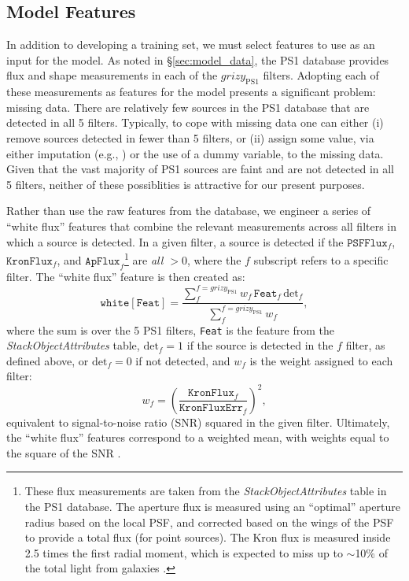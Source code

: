 \documentclass[twocolumn, dvipdfmx]{aastex62}
\begin{document}
\begin{CJK*}{UTF8}{gbsn}
\section{Model Features}\label{sec:model_features}

In addition to developing a training set, we must select features to use as
an input for the model. As noted in \S\ref{sec:model_data}, the PS1 database
provides flux and shape measurements in each of the $grizy_\mathrm{PS1}$
filters. Adopting each of these measurements as features for the model
presents a significant problem: missing data. There are relatively few
sources in the PS1 database that are detected in all 5 filters. Typically,
to cope with missing data one can either (i) remove sources detected in
fewer than 5 filters, or (ii) assign some value, via either imputation
(e.g., \citealt{Miller17}) or the use of a dummy variable, to the missing
data. Given that the vast majority of PS1 sources are faint and are not
detected in all 5 filters, neither of these possiblities is attractive for
our present purposes.

Rather than use the raw features from the database, we engineer a series of ``white flux'' features that combine the relevant measurements across all filters in which a source is detected. In a given filter, a source is detected if the $\mathtt{PSFFlux}_f$, $\mathtt{KronFlux}_f$, 
and $\mathtt{ApFlux}_f$\footnote{These flux measurements are taken from the \textit{StackObjectAttributes} table in the PS1 database. The aperture flux is measured using an ``optimal'' aperture radius based on the local PSF, and corrected based on the wings of the PSF to provide a total flux (for point sources). The Kron flux is measured inside 2.5 times the first radial moment, which is expected to miss up to $\sim$10\% of the total light from galaxies \citep{Magnier16b}.} 
are \textit{all $> 0$}, where the $f$ subscript refers to a specific filter. The ``white flux'' feature is then created as:
%
\begin{equation}
    \mathtt{white[Feat]} =  \frac{\sum_f^{f = grizy_\mathrm{PS1}} w_f  \, \mathtt{Feat}_f \, \mathrm{det}_f}{\sum_f^{f = grizy_\mathrm{PS1}} w_f}, 
\end{equation}
%
where the sum is over the 5 PS1 filters, \texttt{Feat} is the feature from the \textit{StackObjectAttributes} table, $\mathrm{det}_f = 1$ if the source is detected in the $f$ filter, as defined above, or $\mathrm{det}_f = 0$ if not detected, and $w_f$ is the weight assigned to each filter:
%
\begin{equation}
    w_f = \left(\frac{\mathtt{KronFlux}_f}{\mathtt{KronFluxErr}_f}\right)^2,
\end{equation}
%
equivalent to signal-to-noise ratio (SNR) squared in the given filter. 
Ultimately, the ``white flux'' features correspond to a weighted mean, with weights equal to the square of the SNR \citep{Bevington03}. 


\end{CJK*}
\end{document}
